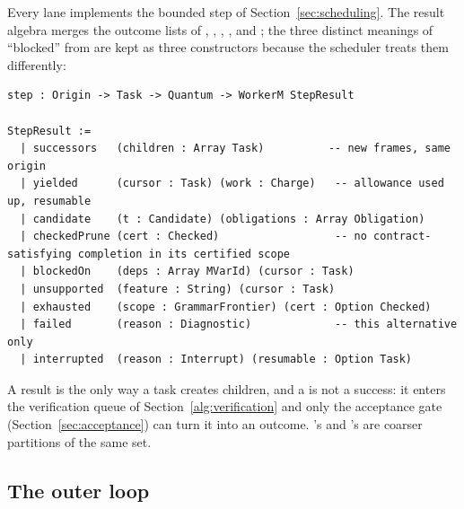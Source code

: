 Every lane implements the bounded step of Section~\ref{sec:scheduling}. The result algebra merges the outcome lists of , , , , and ; the three distinct meanings of ``blocked'' from  are kept as three constructors because the scheduler treats them differently:
\begin{lstlisting}
step : Origin -> Task -> Quantum -> WorkerM StepResult

StepResult :=
  | successors   (children : Array Task)          -- new frames, same origin
  | yielded      (cursor : Task) (work : Charge)   -- allowance used up, resumable
  | candidate    (t : Candidate) (obligations : Array Obligation)
  | checkedPrune (cert : Checked)                  -- no contract-satisfying completion in its certified scope
  | blockedOn    (deps : Array MVarId) (cursor : Task)
  | unsupported  (feature : String) (cursor : Task)
  | exhausted    (scope : GrammarFrontier) (cert : Option Checked)
  | failed       (reason : Diagnostic)             -- this alternative only
  | interrupted  (reason : Interrupt) (resumable : Option Task)
\end{lstlisting}
A  result is the only way a task creates children, and a  is not a success: it enters the verification queue of Section~\ref{alg:verification} and only the acceptance gate (Section~\ref{sec:acceptance}) can turn it into an outcome. 's  and 's  are coarser partitions of the same set.

\subsection{The outer loop}\label{alg:outer}

